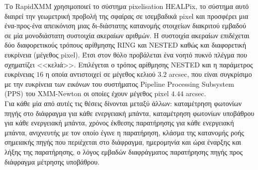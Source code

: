 Το \textlatin{RapidXMM} χρησιμοποιεί το σύστημα \textlatin{pixelisation HEALPix}, το σύστημα αυτό διαιρεί την γεωμετρική προβολή της σφαίρας σε ισεμβαδικά \textlatin{pixel} και προσφέρει μια ένα-προς-ένα απεικόνιση μιας δι-διάστατης κατανομής στοιχείων διακριτού εμβαδού σε μία μονοδιάστατη συστοιχία ακεραίων αριθμών. Η συστοιχία ακεραίων επιδέχεται δύο διαφορετικούς τρόπους αρίθμησης \textlatin{RING} και \textlatin{NESTED} καθώς και διαφορετική ευκρίνεια (μέγεθος \textlatin{pixel}). Έτσι στον θόλο προβάλεται ένα νοητό πυκνό πλέγμα που σχηματίζει <<κελιά>>. Επιλέγεται ο τρόπος αρίθμησης \textlatin{NESTED} και η παράμετρος ευκρίνειας $16$ η οποία αντιστοιχεί σε μέγεθος κελιού $3.2$ \textlatin{arcsec}, που είναι συγκρίσιμο με την ευκρίνεια των εικόνων του συστήματος \textlatin{Pipeline Processing Subsystem (PPS)} του \textlatin{XMM-Newton} οι οποίες έχουν μέγεθος \textlatin{pixel} $4.44$ \textlatin{arcsec}.\\
Για κάθε μία από αυτές τις θέσεις δίνονται μεταξύ άλλων: καταμέτρηση φωτονίων πηγής στο διάφραγμα για κάθε ενεργειακή μπάντα, καταμέτρηση φωτονίων υποβάθρου για κάθε ενεργειακή μπάντα, χρόνος έκθεσης παρατήρησης για κάθε ενεργειακή μπάντα, ανιχνευτής με τον οποίο έγινε η παρατήρηση, κλάσμα της κατανομής ροής σημειακής πηγής που περιέχεται στο διάφραγμα, ημερομηνία και ώρα έναρξης και λήξης της παρατήρησης, ο λόγος εμβαδών διαφράγματος παρατήρησης πηγής προς διάφραγμα μέτρησης υποβάθρου.


